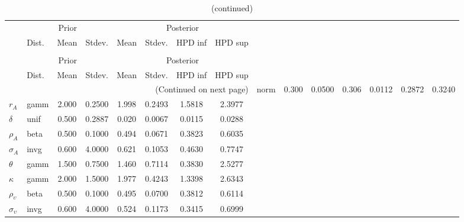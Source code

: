  
\begin{center}
\begin{longtable}{llcccccc} 
\caption{Results from Metropolis-Hastings (parameters)}
 \label{Table:MHPosterior:1}\\
\toprule 
  & \multicolumn{3}{c}{Prior}  &  \multicolumn{4}{c}{Posterior} \\
  \cmidrule(r{.75em}){2-4} \cmidrule(r{.75em}){5-8}
  & Dist. & Mean  & Stdev. & Mean & Stdev. & HPD inf & HPD sup\\
\midrule \endfirsthead 
\caption{(continued)}\\\toprule 
  & \multicolumn{3}{c}{Prior}  &  \multicolumn{4}{c}{Posterior} \\
  \cmidrule(r{.75em}){2-4} \cmidrule(r{.75em}){5-8}
  & Dist. & Mean  & Stdev. & Mean & Stdev. & HPD inf & HPD sup\\
\midrule \endhead 
\bottomrule \multicolumn{8}{r}{(Continued on next page)} \endfoot 
\bottomrule \endlastfoot 
${\alpha}$ & norm &   0.300 & 0.0500 &   0.306& 0.0112 &  0.2872 &  0.3240 \\ 
${r_{A}}$ & gamm &   2.000 & 0.2500 &   1.998& 0.2493 &  1.5818 &  2.3977 \\ 
${\delta}$ & unif &   0.500 & 0.2887 &   0.020& 0.0067 &  0.0115 &  0.0288 \\ 
${\rho_A}$ & beta &   0.500 & 0.1000 &   0.494& 0.0671 &  0.3823 &  0.6035 \\ 
${\sigma_A}$ & invg &   0.600 & 4.0000 &   0.621& 0.1053 &  0.4630 &  0.7747 \\ 
${\theta}$ & gamm &   1.500 & 0.7500 &   1.460& 0.7114 &  0.3830 &  2.5277 \\ 
${\kappa}$ & gamm &   2.000 & 1.5000 &   1.977& 0.4243 &  1.3398 &  2.6343 \\ 
${\rho_\upsilon}$ & beta &   0.500 & 0.1000 &   0.495& 0.0700 &  0.3812 &  0.6114 \\ 
${\sigma_\upsilon}$ & invg &   0.600 & 4.0000 &   0.524& 0.1173 &  0.3415 &  0.6999 \\ 
\end{longtable}
 \end{center}
